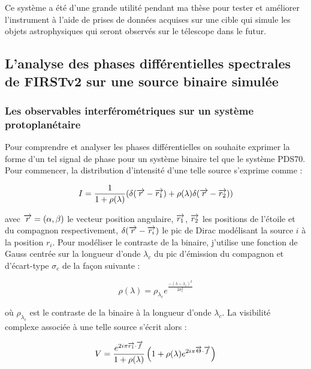 Ce système a été d'une grande utilité pendant ma thèse pour tester et améliorer l'instrument à l'aide de prises de données acquises sur une cible qui simule les objets astrophysiques qui seront observés sur le télescope dans le futur.


\subsection{L'analyse des phases différentielles spectrales de FIRSTv2 sur une source binaire simulée}
\label{sec:PhaseDiffAnalyse}

\subsubsection{Les observables interférométriques sur un système protoplanétaire}

Pour comprendre et analyser les phases différentielles on souhaite exprimer la forme d'un tel signal de phase pour un système binaire tel que le système PDS70. Pour commencer, la distribution d'intensité d'une telle source s'exprime comme :

\begin{equation}
    I = \frac{1}{1 + \rho(\lambda)} (\delta(\overrightarrow{r} - \overrightarrow{r_1}) + \rho(\lambda) \delta(\overrightarrow{r} - \overrightarrow{r_2}))
\end{equation}

avec $\overrightarrow{r} = (\alpha, \beta)$ le vecteur position angulaire, $\overrightarrow{r_1}$, $\overrightarrow{r_2}$ les positions de l'étoile et du compagnon respectivement, $\delta(\overrightarrow{r} - \overrightarrow{r_i})$ le pic de Dirac modélisant la source $i$ à la position $r_i$. Pour modéliser le contraste de la binaire, j'utilise une fonction de Gauss centrée sur la longueur d'onde $\lambda_c$ du pic d'émission du compagnon et d'écart-type $\sigma_c$ de la façon suivante : 

\begin{equation}
    \rho(\lambda) = \rho_{\lambda_c} e^{\frac{-(\lambda - \lambda_c)^2}{2 \sigma_{c}^2}}
\end{equation}

où $\rho_{\lambda_c}$ est le contraste de la binaire à la longueur d'onde $\lambda_c$. La visibilité complexe associée à une telle source s'écrit alors :

\begin{equation}
    V = \frac{e^{2i\pi \overrightarrow{r_1} \cdot \overrightarrow{f}}}{1 + \rho(\lambda)} \left( 1 + \rho(\lambda) e^{2i\pi \overrightarrow{\Theta} \cdot \overrightarrow{f}} \right)
\end{equation}

